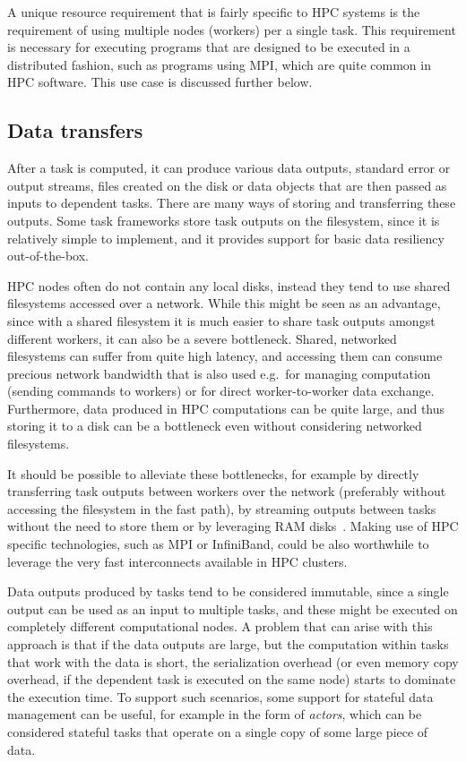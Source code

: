 A unique resource requirement that is fairly specific to HPC systems is the requirement of using
multiple nodes (workers) per a single task. This requirement is necessary for executing programs
that are designed to be executed in a distributed fashion, such as programs using MPI, which are
quite common in HPC software. This use case is discussed further below.

\subsection{Data transfers}
After a task is computed, it can produce various data outputs, standard error or output
streams, files created on the disk or data objects that are then passed as inputs to dependent
tasks. There are many ways of storing and transferring these outputs. Some task frameworks store
task outputs on the filesystem, since it is relatively simple to implement, and it provides
support for basic data resiliency out-of-the-box.

HPC nodes often do not contain any local disks, instead they tend to use shared filesystems
accessed over a network. While this might be seen as an advantage, since with a shared filesystem
it is much easier to share task outputs amongst different workers, it can also be a severe
bottleneck. Shared, networked filesystems can suffer from quite high latency, and accessing them
can consume precious network bandwidth that is also used e.g.\ for managing computation
(sending commands to workers) or for direct worker-to-worker data exchange.
Furthermore, data produced in HPC computations can be quite large, and thus storing it to a disk
can be a bottleneck even without considering networked filesystems.

It should be possible to alleviate these bottlenecks, for example by directly transferring task
outputs between workers over the network (preferably without accessing the filesystem in the
fast path), by streaming outputs between tasks without the need to store them or by leveraging
RAM disks~\cite{hyperloom}. Making use of HPC specific technologies, such as MPI or InfiniBand,
could be also worthwhile to leverage the very fast interconnects available in HPC clusters.

Data outputs produced by tasks tend to be considered immutable, since a single output can be
used as an input to multiple tasks, and these might be executed on completely different
computational nodes. A problem that can arise with this approach is that if the data outputs are
large, but the computation within tasks that work with the data is short, the serialization
overhead
(or even memory copy overhead, if the dependent task is executed on the same node) starts to
dominate the execution time. To support such scenarios, some support for stateful data management
can be useful, for example in the form of \emph{actors}, which can be considered stateful tasks
that
operate on a single copy of some large piece of data.


